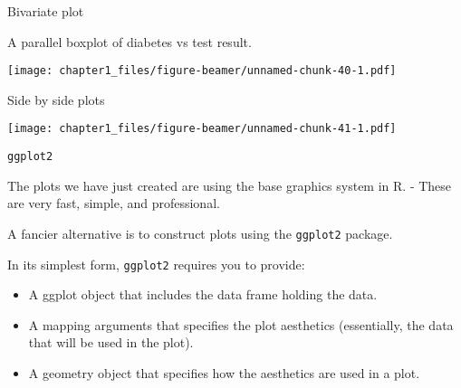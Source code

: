 \begin{frame}[fragile]{Bivariate plot}
\protect\hypertarget{bivariate-plot-1}{}

A parallel boxplot of diabetes vs test result.

\begin{Shaded}
\begin{Highlighting}[]
\OperatorTok{~}\StringTok{ }
\end{Highlighting}
\end{Shaded}

\texttt{[image: chapter1\_files/figure-beamer/unnamed-chunk-40-1.pdf]}

\end{frame}

\begin{frame}[fragile]{Side by side plots}
\protect\hypertarget{side-by-side-plots}{}

\begin{Shaded}
\begin{Highlighting}[]
\NormalTok{(}\NormalTok{(}\NormalTok{,}\NormalTok{))}
\OperatorTok{~}\StringTok{ }
\OperatorTok{~}\StringTok{ }
\end{Highlighting}
\end{Shaded}

\texttt{[image: chapter1\_files/figure-beamer/unnamed-chunk-41-1.pdf]}

\end{frame}

\begin{frame}[fragile]{\texttt{ggplot2}}
\protect\hypertarget{ggplot2}{}

The plots we have just created are using the base graphics system in R.
- These are very fast, simple, and professional.

A fancier alternative is to construct plots using the \texttt{ggplot2}
package.

In its simplest form, \texttt{ggplot2} requires you to provide:

\begin{itemize}
\tightlist
\item
  A ggplot object that includes the data frame holding the data.
\item
  A mapping arguments that specifies the plot aesthetics (essentially,
  the data that will be used in the plot).
\item
  A geometry object that specifies how the aesthetics are used in a
  plot.
\end{itemize}

\end{frame}

